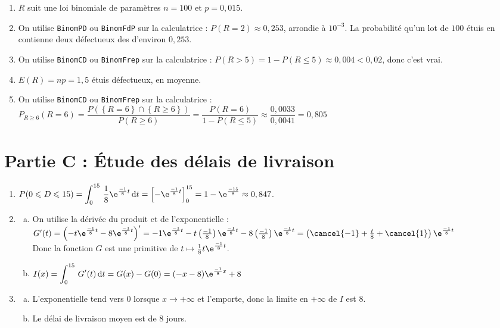 \documentclass[a4paper,12pt]{article} \usepackage{FBarticle} \mapage{Probabilités 2}{931} %
\begin{document}
\begin{enumerate}[1.]
\item $R$ suit une loi binomiale de paramètres $n=100$ et $p=0,015$.
\item On utilise \texttt{BinomPD} ou \texttt{BinomFdP} sur la calculatrice :
$P(R=2)\approx 0,253$, arrondie à $10^{-3}$. La probabilité qu'un lot de $100$ étuis en contienne deux défectueux des d'environ $0,253$.
\item On utilise \texttt{BinomCD} ou \texttt{BinomFrep} sur la calculatrice :
$P(R>5)=1-P(R\leqslant 5)\approx 0,004<0,02$, donc c'est vrai.
\item $E(R)=np=1,5$ étuis défectueux, en moyenne.
\item On utilise \texttt{BinomCD} ou \texttt{BinomFrep} sur la calculatrice :
$P_{R\geqslant 6}(R=6)=\dfrac{P(\left\{R=6\right\}\cap\left\{R\geqslant6\right\})}{P(R\geqslant6)}=\dfrac{P(R=6)}{1-P(R\leqslant 5)}\approx\dfrac{0,0033}{0,0041}=0,805$

\end{enumerate}

\section*{Partie C : Étude des délais de livraison}

\begin{enumerate}[1.]
\item $P(0\leqslant D\leqslant15)=\displaystyle\int_0^{15}\,\dfrac{1}{8}\e^{\frac{-1}{8}t}\,\textrm{d}t=\left[-\e^{\frac{-1}{8}t}\right]_0^{15}=1-\e^{\frac{-15}{8}}\approx0,847$.
\item
	\begin{enumerate}[a)]
	\item On utilise la dérivée du produit et de l'exponentielle :\\
	$G'(t)
	=\left({-t}{\e^{\frac{-1}{8}t}}-8\e^{\frac{-1}{8}t}\right)'
	=-1\e^{\frac{-1}{8}t}-t\left(\frac{-1}{8}\right)\e^{\frac{-1}{8}t}-8\left(\frac{-1}{8}\right)\e^{\frac{-1}{8}t}
	=\left(\cancel{-1}+\frac{t}{8}+\cancel{1}\right)\e^{\frac{-1}{8}t}
	$\\
	Donc la fonction $G$ est une primitive de $t \mapsto \frac{1}{8}t\e^{\frac{-1}{8}t}$.
	\item 
	$I(x)
	=\displaystyle\int_0^{15}\,G'(t)\,\textrm{d}t
	=G(x)-G(0)
	=(-x-8)\e^{\frac{-1}{8}x}+8
	$
	\end{enumerate}
	\item 
	\begin{enumerate}[a)]
	\item L'exponentielle tend vers $0$ lorsque $x\to+\infty$ et l'emporte, donc la limite en $+\infty$ de $I$ est $8$.
	\item Le délai de livraison moyen est de $8$ jours.
	\end{enumerate}
\end{enumerate}
\end{document}
